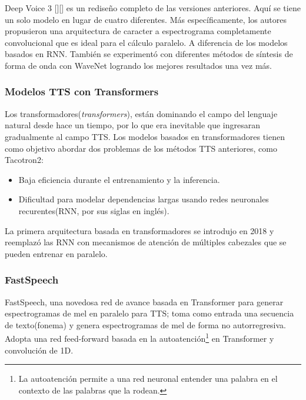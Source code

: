 Deep Voice 3 [\cite{arik2018neural}][\cite{deep-voice3}] es un rediseño completo de las versiones anteriores. Aquí se tiene un solo modelo en lugar de cuatro diferentes. Más específicamente, los autores propusieron una arquitectura de caracter a espectrograma completamente convolucional que es ideal para el cálculo paralelo. A diferencia de los modelos basados en RNN. También se experimentó con diferentes métodos de síntesis de forma de onda con WaveNet logrando los mejores resultados una vez más.

\subsubsection{Modelos TTS con Transformers}
Los transformadores(\textit{transformers}), están dominando el campo del lenguaje natural desde hace un tiempo, por lo que era inevitable que ingresaran gradualmente al campo TTS. Los modelos basados en transformadores tienen como objetivo abordar dos problemas de los métodos TTS anteriores, como Tacotron2:

\begin{itemize}
	\item Baja eficiencia durante el entrenamiento y la inferencia.
	\item Dificultad para modelar dependencias largas usando redes neuronales recurentes(RNN, por sus siglas en inglés).
\end{itemize}
La primera arquitectura basada en transformadores se introdujo en 2018 y reemplazó las RNN con mecanismos de atención de múltiples cabezales que se pueden entrenar en paralelo.

\subsubsection{FastSpeech}

FastSpeech, una novedosa red de avance basada en Transformer para generar espectrogramas de mel en paralelo para TTS; toma como entrada una secuencia de texto(fonema) y genera espectrogramas de mel de forma no autorregresiva. Adopta una red feed-forward basada en la autoatención\footnote{La autoatención permite a una red neuronal entender una palabra en el contexto de las palabras que la rodean.} en Transformer y convolución de 1D. 


